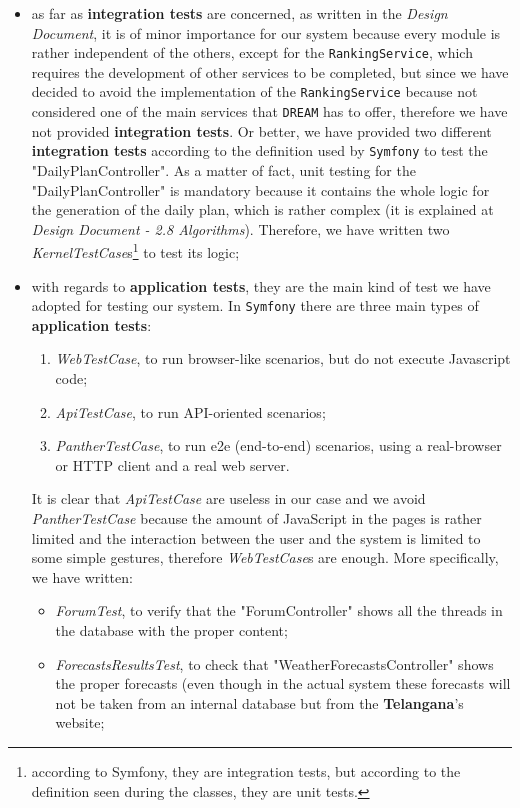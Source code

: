 \documentclass{article}
\begin{document}
\begin{itemize}
    \item as far as \textbf{integration tests} are concerned, as written in the \textit{Design Document}, it is of minor importance for our system because every module is rather independent of the others, except for the \verb|RankingService|, which requires the development of other services to be completed, but since we have decided to avoid the implementation of the \verb|RankingService| because not considered one of the main services that \verb|DREAM| has to offer, therefore we have not provided \textbf{integration tests}. Or better, we have provided two different \textbf{integration tests} according to the definition used by \verb|Symfony| to test the "DailyPlanController". As a matter of fact, unit testing for the "DailyPlanController" is mandatory because it contains the whole logic for the generation of the daily plan, which is rather complex (it is explained at \textit{Design Document - 2.8 Algorithms}). Therefore, we have written two \textit{KernelTestCase}s\footnote{according to Symfony, they are integration tests, but according to the definition seen during the classes, they are unit tests.} to test its logic;
    \item with regards to \textbf{application tests}, they are the main kind of test we have adopted for testing our system. In \verb|Symfony| there are three main types of \textbf{application tests}:
    \begin{enumerate}
        \item \textit{WebTestCase}, to run browser-like scenarios, but do not execute Javascript code;
        \item \textit{ApiTestCase}, to run API-oriented scenarios;
        \item \textit{PantherTestCase}, to run e2e (end-to-end) scenarios, using a real-browser or HTTP client and a real web server.
    \end{enumerate}
    It is clear that \textit{ApiTestCase} are useless in our case and we avoid \textit{PantherTestCase} because the amount of JavaScript in the pages is rather limited and the interaction between the user and the system is limited to some simple gestures, therefore \textit{WebTestCase}s are enough. More specifically, we have written:
    \begin{itemize}
        \item \textit{ForumTest}, to verify that the "ForumController" shows all the threads in the database with the proper content;
        \item \textit{ForecastsResultsTest}, to check that "WeatherForecastsController" shows the proper forecasts (even though in the actual system these forecasts will not be taken from an internal database but from the \textbf{Telangana}'s website;

\end{itemize}
\end{itemize}
\end{document}
